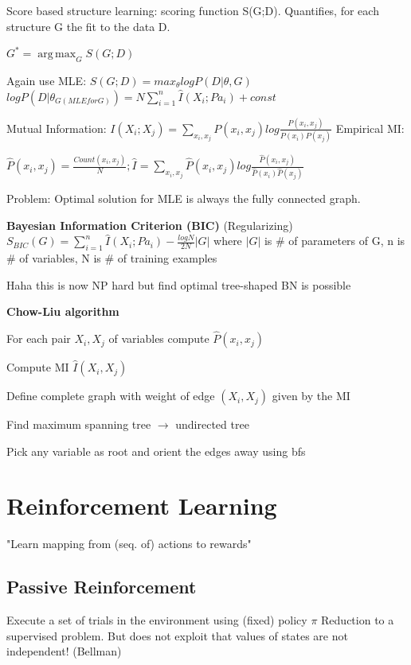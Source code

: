 \documentclass[a4paper, 11pt, landscape]{article}
\DeclareMathOperator*{\argmax}{arg\,max}
\begin{document}
\begin{multicols*}{3}
Score based structure learning: scoring function S(G;D). Quantifies, for each structure G the fit to the data D. 

$G^* = \argmax_G S(G;D)$

Again use MLE: $S(G;D) = max_\theta log P(D | \theta, G)$
$log P(D | \theta_{G (MLE for G)}) = N \sum_{i=1}^{n} \hat{I}(X_i ; Pa_i) + const$

Mutual Information: $I(X_i; X_j) = \sum_{x_i, x_j} P(x_i, x_j) log \frac{P(x_i, x_j)}{P(x_i) P(x_j)}$
Empirical MI: 

$\hat{P}(x_i, x_j) = \frac{Count(x_i, x_j)}{N}; \hat{I} = \sum_{x_i, x_j} \hat{P}(x_i, x_j) log \frac{\hat{P}(x_i, x_j)}{\hat{P}(x_i) \hat{P}(x_j)}$

Problem: Optimal solution for MLE is always the fully  connected graph. 

\textbf{Bayesian Information Criterion (BIC)}
(Regularizing) $S_{BIC}(G) = \sum_{i=1}^{n} \hat{I}(X_i ; Pa_i) - \frac{log N}{2N} |G|$ where $|G|$ is \# of parameters of G, n is \# of variables, N is \# of training examples

Haha this is now NP hard but find optimal tree-shaped BN is possible

\textbf{Chow-Liu algorithm}
\begin{compactitem}
	\item For each pair $X_i, X_j$ of variables compute $\hat{P}(x_i, x_j)$
	\item Compute MI $\hat{I}(X_i, X_j)$
	\item Define complete graph with weight of edge $(X_i,X_j)$ given by the MI
	\item Find maximum spanning tree $\rightarrow$ undirected tree
	\item Pick any variable as root and orient the edges away using bfs

\end{compactitem}


\section{Reinforcement Learning}
"Learn mapping from (seq. of) actions to rewards"

\subsection{Passive Reinforcement}
Execute a set of trials in the environment using (fixed) policy  $\pi$
Reduction to a supervised problem. But does not exploit that values of states are not independent! (Bellman)


\end{multicols*}
\end{document}
